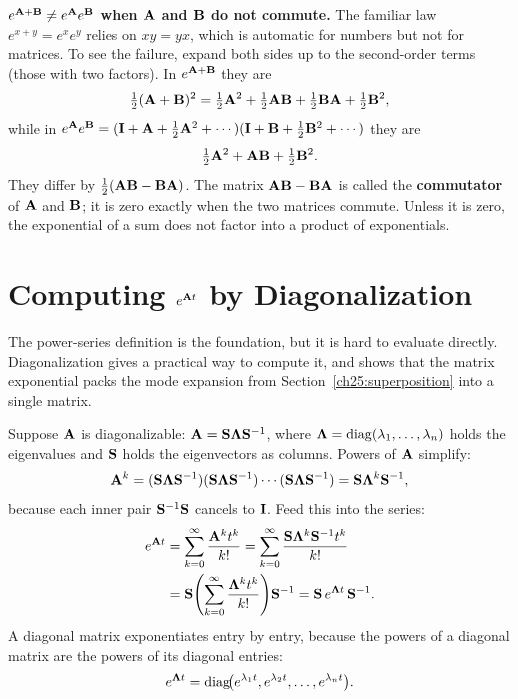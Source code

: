 \begin{trapbox}
\textbf{$e^{\mathbf{A}+\mathbf{B}} \neq e^{\mathbf{A}}e^{\mathbf{B}}$ when $\mathbf{A}$ and
$\mathbf{B}$ do not commute.} The familiar law $e^{x+y}=e^xe^y$ relies on
$xy=yx$, which is automatic for numbers but not for matrices. To see the
failure, expand both sides up to the second-order terms (those with two
factors). In $e^{\mathbf{A}+\mathbf{B}}$ they are
\[
  \tfrac12(\mathbf{A}+\mathbf{B})^2 = \tfrac12\mathbf{A}^2 + \tfrac12\mathbf{A}\mathbf{B}
  + \tfrac12\mathbf{B}\mathbf{A} + \tfrac12\mathbf{B}^2,
\]
while in $e^{\mathbf{A}}e^{\mathbf{B}} = (\mathbf{I}+\mathbf{A}+\tfrac12\mathbf{A}^2+\cdots)
(\mathbf{I}+\mathbf{B}+\tfrac12\mathbf{B}^2+\cdots)$ they are
\[
  \tfrac12\mathbf{A}^2 + \mathbf{A}\mathbf{B} + \tfrac12\mathbf{B}^2.
\]
They differ by $\tfrac12(\mathbf{A}\mathbf{B}-\mathbf{B}\mathbf{A})$. The matrix
$\mathbf{A}\mathbf{B}-\mathbf{B}\mathbf{A}$ is called the \textbf{commutator} of $\mathbf{A}$
and $\mathbf{B}$; it is zero exactly when the two matrices commute. Unless it
is zero, the exponential of a sum does not factor into a product of
exponentials.
\end{trapbox}

\section{Computing $e^{\mathbf{A}t}$ by Diagonalization}
\label{ch25:diag}

The power-series definition is the foundation, but it is hard to evaluate directly.
Diagonalization gives a practical way to compute it, and shows that the matrix
exponential packs the mode expansion from Section~\ref{ch25:superposition} into a single
matrix.

Suppose $\mathbf{A}$ is diagonalizable: $\mathbf{A} = \mathbf{S}\mathbf{\Lambda}\mathbf{S}^{-1}$,
where $\mathbf{\Lambda} = \operatorname{diag}(\lambda_1,\dots,\lambda_n)$ holds the eigenvalues and
$\mathbf{S}$ holds the eigenvectors as columns. Powers of $\mathbf{A}$ simplify:
\[
  \mathbf{A}^k
  = (\mathbf{S}\mathbf{\Lambda}\mathbf{S}^{-1})(\mathbf{S}\mathbf{\Lambda}\mathbf{S}^{-1})\cdots(\mathbf{S}\mathbf{\Lambda}\mathbf{S}^{-1})
  = \mathbf{S}\mathbf{\Lambda}^k\mathbf{S}^{-1},
\]
because each inner pair $\mathbf{S}^{-1}\mathbf{S}$ cancels to $\mathbf{I}$. Feed this into the series:
\begin{align*}
  e^{\mathbf{A}t}
  &= \sum_{k=0}^\infty \frac{\mathbf{A}^k t^k}{k!}
   = \sum_{k=0}^\infty \frac{\mathbf{S}\mathbf{\Lambda}^k\mathbf{S}^{-1} t^k}{k!}\\
  &= \mathbf{S}\!\left(\sum_{k=0}^\infty \frac{\mathbf{\Lambda}^k t^k}{k!}\right)\!\mathbf{S}^{-1}
   = \mathbf{S}\, e^{\mathbf{\Lambda}t}\,\mathbf{S}^{-1}.
\end{align*}
A diagonal matrix exponentiates entry by entry, because the powers of a diagonal
matrix are the powers of its diagonal entries:
\[
  e^{\mathbf{\Lambda}t}
  = \operatorname{diag}\!\bigl(e^{\lambda_1 t}, e^{\lambda_2 t}, \dots, e^{\lambda_n t}\bigr).
\]


